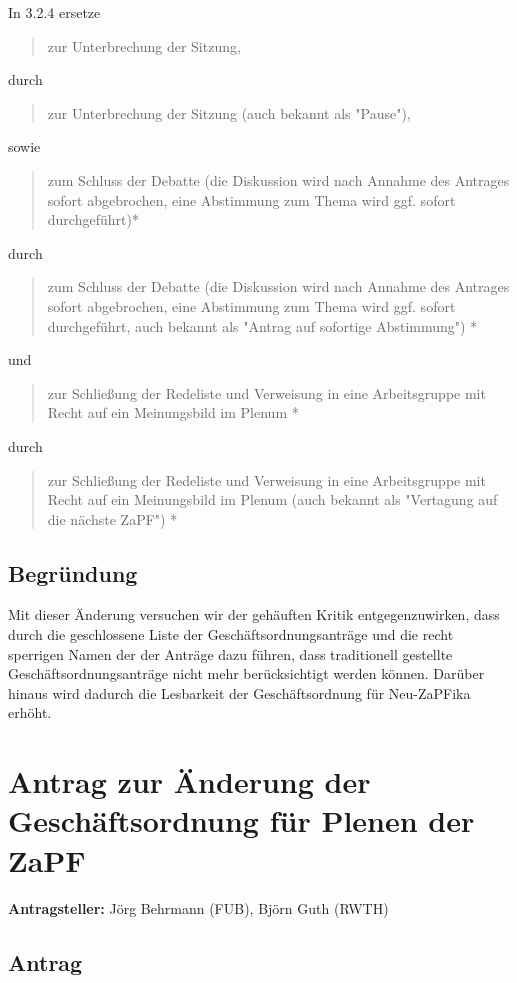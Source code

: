 \documentclass[draft,10pt,oneside]{scrartcl}
\begin{document}
In 3.2.4 ersetze
\begin{quote}
	zur Unterbrechung der Sitzung,
\end{quote}
durch
\begin{quote}
	zur Unterbrechung der Sitzung (auch bekannt als "Pause"),
\end{quote}
sowie
\begin{quote}
	zum Schluss der Debatte (die Diskussion wird nach Annahme des Antrages
	sofort abgebrochen, eine Abstimmung zum Thema wird ggf. sofort
	durchgeführt)*
\end{quote}
durch
\begin{quote}
	zum Schluss der Debatte (die Diskussion wird nach Annahme des Antrages
	sofort abgebrochen, eine Abstimmung zum Thema wird ggf. sofort
	durchgeführt, auch bekannt als "Antrag auf sofortige Abstimmung") *
\end{quote}
und
\begin{quote}
	zur Schließung der Redeliste und Verweisung in eine Arbeitsgruppe mit Recht
	auf ein Meinungsbild im Plenum *
\end{quote}
durch
\begin{quote}
	zur Schließung der Redeliste und Verweisung in eine Arbeitsgruppe mit Recht
	auf ein Meinungsbild im Plenum (auch bekannt als "Vertagung auf die nächste
	ZaPF") *
\end{quote}

\subsection*{Begründung}
Mit dieser Änderung versuchen wir der gehäuften Kritik entgegenzuwirken, dass
durch die geschlossene Liste der Geschäftsordnungsanträge und die recht
sperrigen Namen der der Anträge dazu führen, dass traditionell gestellte
Geschäftsordnungsanträge nicht mehr berücksichtigt werden können.
Darüber hinaus wird dadurch die Lesbarkeit der Geschäftsordnung für Neu-ZaPFika
erhöht.

\newpage

\section*{Antrag zur Änderung der Geschäftsordnung für Plenen der ZaPF}

\textbf{Antragsteller:} Jörg Behrmann (FUB), Björn Guth (RWTH)

\subsection*{Antrag}
\end{document}
